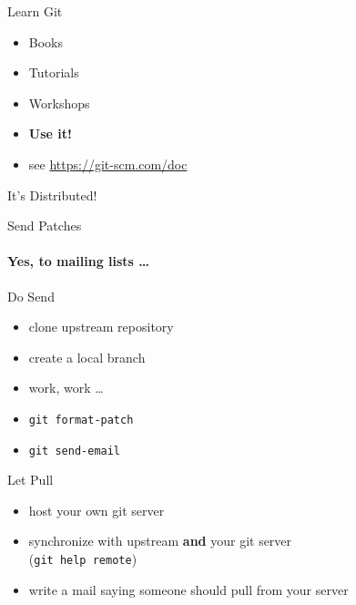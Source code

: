 \documentclass{beamer}
\makeatletter
\newcommand{\strong}[1]{\@strong{#1}}
\newcommand{\@@strong}[1]{\textbf{\let\@strong\@@@strong#1}}
\newcommand{\@@@strong}[1]{\textnormal{\let\@strong\@@strong#1}}
\let\@strong\@@strong
\makeatother
\begin{document}
\begin{frame}{Learn Git}
    \begin{itemize}
        \item Books
        \item Tutorials
        \item Workshops
        \item \strong{Use it!}
        \item see \url{https://git-scm.com/doc}
    \end{itemize}
\end{frame}

\begin{frame}{It's Distributed!}
\end{frame}

\begin{frame}{Send Patches}
    \framesubtitle{Yes, to mailing lists \dots}
    \begin{block}{Do Send}
        \begin{itemize}
            \item clone upstream repository
            \item create a local branch
            \item work, work \dots
            \item \texttt{git format-patch}
            \item \texttt{git send-email}
        \end{itemize}
    \end{block}
    \pause
    \begin{block}{Let Pull}
        \begin{itemize}
            \item host your own git server
            \item synchronize with upstream \strong{and} your git server \\
                    (\texttt{git help remote})
            \item write a mail saying someone should pull from your server
        \end{itemize}
    \end{block}
\end{frame}
\end{document}
